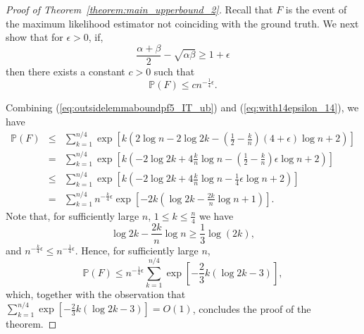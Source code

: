 \documentclass[english]{article}
\newtheorem{lemma}{Lemma}
\newcommand{\1}{\textbf{1}}
\newcommand{\p}{\mathbb{P}}
\begin{document}
\begin{proof}[Proof of Theorem~\ref{theorem:main_upperbound_2}]
Recall that $F$ is the event of the maximum likelihood estimator not coinciding with the ground truth. We next show that for $\epsilon>0$, if,
\[
\frac{\alpha+\beta}{2} -\sqrt{\alpha \beta} \geq 1+\epsilon
\]
then there exists a constant $c>0$ such that
\begin{equation}\label{eq:with14epsilon_14}
\p(F) \leq cn^{-\frac14\epsilon}.
\end{equation}

Combining (\ref{eq:outsidelemmaboundpf5_IT_ub}) and (\ref{eq:with14epsilon_14}), we have
\begin{eqnarray}
\p(F) & \leq &  \sum_{k=1}^{n/4}  \exp\left[k\left( 2 \log n - 2\log 2k - \left(\frac{1}2-\frac{k}n\right) \left( 4+\epsilon \right) \log n +2\right)\right]\nonumber\\
& = &  \sum_{k=1}^{n/4}  \exp\left[k\left(  - 2\log 2k +  4\frac{k}n\log n - \left(\frac{1}2-\frac{k}n\right) \epsilon \log n+2 \right)\right]\nonumber\\
& \leq &  \sum_{k=1}^{n/4}  \exp\left[k\left(  - 2\log 2k +  4\frac{k}n\log n - \frac{1}4\epsilon \log n+2 \right)\right]\\
& = &  \sum_{k=1}^{n/4} n^{-\frac{k}4\epsilon} \exp\left[-2k\left( \log 2k -  \frac{2k}n\log n +1 \right)\right].\nonumber
\end{eqnarray}
Note that, for sufficiently large $n$, $1\leq k\leq \frac{n}4$ we have
\[
\log 2k -  \frac{2k}n\log n \geq \frac13 \log(2k),
\]
and $ n^{-\frac{k}4\epsilon} \leq n^{-\frac{1}4\epsilon}$.
Hence, for sufficiently large $n$,
\[
\p(F) \leq n^{-\frac{1}4\epsilon}\sum_{k=1}^{n/4} \exp\left[-\frac23k\left(\log 2k-3\right)\right],
\]
which, together with the observation that $\sum_{k=1}^{n/4} \exp\left[-\frac23k\left(\log 2k-3\right)\right] = O(1)$, concludes the proof of the theorem.
\end{proof}
\end{document}
